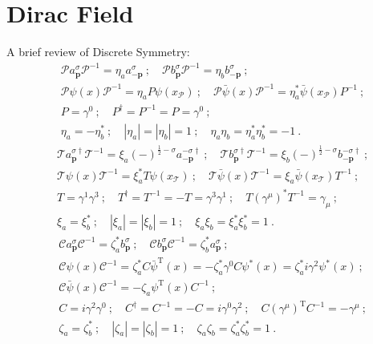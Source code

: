 \documentclass[12pt]{report}
\numberwithin{problemname}{chapter}
\begin{document}
\chapter{Dirac Field}

A brief review of Discrete Symmetry:
\begin{align}
    &\mathcal{P}a_{\mathbf{p}}^{\sigma}\mathcal{P}^{-1}=\eta_a a_{-\mathbf{p}}^{\sigma}\ ;\quad\mathcal{P}b_{\mathbf{p}}^{\sigma}\mathcal{P}^{-1}=\eta_b b_{-\mathbf{p}}^{\sigma}\ ; \nonumber \\
    &\mathcal{P}\psi(x)\mathcal{P}^{-1}=\eta_aP\psi(x_{\mathcal{P}})\ ;\quad\mathcal{P}\bar{\psi}(x)\mathcal{P}^{-1}=\eta_a^*\bar{\psi}(x_{\mathcal{P}})P^{-1}\ ;\nonumber \\
    &P=\gamma^0\ ;\quad P^{\dagger}=P^{-1}=P=\gamma^0\ ;\nonumber \\
    &\eta_a=-\eta_b^*\ ;\quad|\eta_a|=|\eta_b|=1\ ;\quad \eta_a\eta_b=\eta_a^*\eta_b^*=-1\ .
\end{align}
\begin{align}
    &\mathcal{T}a_{\mathbf{p}}^{\sigma\dagger}\mathcal{T}^{-1}=\xi_a(-)^{\frac{1}{2}-\sigma} a_{-\mathbf{p}}^{-\sigma\dagger}\ ;\quad\mathcal{T}b_{\mathbf{p}}^{\sigma\dagger}\mathcal{T}^{-1}=\xi_b(-)^{\frac{1}{2}-\sigma} b_{-\mathbf{p}}^{-\sigma\dagger}\ ; \nonumber \\
    &\mathcal{T}\psi(x)\mathcal{T}^{-1}=\xi^*_aT\psi(x_{\mathcal{T}})\ ;\quad\mathcal{T}\bar{\psi}(x)\mathcal{T}^{-1}=\xi_a\bar{\psi}(x_{\mathcal{T}})T^{-1}\ ;\nonumber \\
    &T=\gamma^1\gamma^3\ ;\quad T^{\dagger}=T^{-1}=-T=\gamma^3\gamma^1\ ;\quad T(\gamma^{\mu})^*T^{-1}=\gamma_{\mu}\ ;\nonumber \\
    &\xi_a=\xi_b^*\ ;\quad|\xi_a|=|\xi_b|=1\ ;\quad \xi_a\xi_b=\xi_a^*\xi_b^*=1\ .
\end{align}
\begin{align}
    &\mathcal{C}a_{\mathbf{p}}^{\sigma}\mathcal{C}^{-1}=\zeta_a^*b_{\mathbf{p}}^{\sigma}\ ;\quad\mathcal{C}b_{\mathbf{p}}^{\sigma}\mathcal{C}^{-1}=\zeta_b^*a_{\mathbf{p}}^{\sigma}\ ; \nonumber \\
    &\mathcal{C}\psi(x)\mathcal{C}^{-1}=\zeta^*_aC\bar{\psi}^{\text{T}}(x)=-\zeta^*_a\gamma^0C\psi^*(x)=\zeta^*_ai\gamma^2\psi^*(x)\ ;\nonumber \\
    &\mathcal{C}\bar{\psi}(x)\mathcal{C}^{-1}=-\zeta_a\psi^{\text{T}}(x)C^{-1}\ ;\nonumber \\
    &C=i\gamma^2\gamma^0\ ;\quad C^{\dagger}=C^{-1}=-C=i\gamma^0\gamma^2\ ;\quad C(\gamma^{\mu})^{\text{T}}C^{-1}=-\gamma^{\mu}\ ;\nonumber \\
    &\zeta_a=\zeta_b^*\ ;\quad|\zeta_a|=|\zeta_b|=1\ ;\quad \zeta_a\zeta_b=\zeta_a^*\zeta_b^*=1\ .
\end{align}
\end{document}
